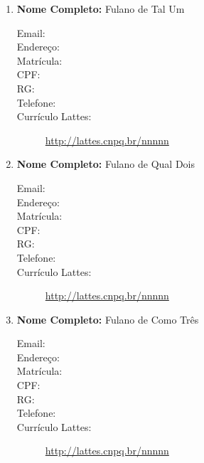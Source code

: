 \documentclass[a4paper,12pt]{article} %
\begin{document}
\begin{enumerate}
    \item \textbf{Nome Completo:} Fulano de Tal Um
    \begin{description}
        \item [Email:] 
        \item [Endereço:]
        \item [Matrícula:]
        \item [CPF:]
        \item [RG:]
        \item [Telefone:]
        \item [Currículo Lattes:] \url{http://lattes.cnpq.br/nnnnn}
    \end{description}

    \item \textbf{Nome Completo:} Fulano de Qual Dois
    \begin{description}
        \item [Email:] 
        \item [Endereço:]
        \item [Matrícula:]
        \item [CPF:]
        \item [RG:]
        \item [Telefone:]
        \item [Currículo Lattes:] \url{http://lattes.cnpq.br/nnnnn}
    \end{description}

    \item \textbf{Nome Completo:} Fulano de Como Três
    \begin{description}
        \item [Email:] 
        \item [Endereço:]
        \item [Matrícula:]
        \item [CPF:]
        \item [RG:]
        \item [Telefone:]
        \item [Currículo Lattes:] \url{http://lattes.cnpq.br/nnnnn}
    \end{description}



\end{enumerate}
\end{document}
